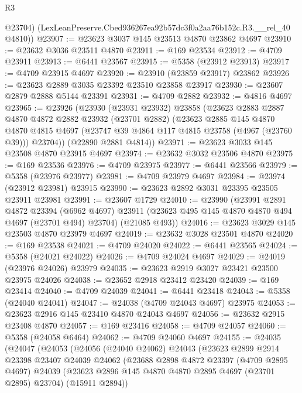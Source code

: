 \begin{lexlean}{R3}
\begin{coremodule}
        @23704)
      (LexLeanPreserve.Cbed936267ea92b57dc3f0a2aa76b152c.R3.__rel_40 @4810))
@23907 := @23623 @3037 @145 @23513 @4870 @23862 @4697
@23910 := @23632 @3036 @23511 @4870
@23911 := @169 @23534
@23912 := @4709 @23911
@23913 := @6441 @23567
@23915 := @5358 (@23912 @23913)
@23917 := @4709 @23915 @4697
@23920 := @23910 (@23859 @23917) @23862
@23926 := @23623 @2889 @3035 @23392 @23510 @23858 @23917
@23930 := @23607 @2879 @2888 @5144 @23391
@23931 := @4709 @2882
@23932 := @4816 @4697
@23965 := @23926
    (@23930
      (@23931 @23932)
      @23858
      (@23623
        @2883
        @2887
        @4870
        @4872
        @2882
        @23932
        (@23701 @2882)
        (@23623
          @2885
          @145
          @4870
          @4870
          @4815
          @4697
          (@23747 @39 @4864 @117 @4815 @23758 (@4967 (@23760 @39)))
          @23704))
      (@22890 @2881 @4814))
@23971 := @23623 @3033 @145 @23508 @4870 @23915 @4697
@23974 := @23632 @3032 @23506 @4870
@23975 := @169 @23536
@23976 := @4709 @23975
@23977 := @6441 @23566
@23979 := @5358 (@23976 @23977)
@23981 := @4709 @23979 @4697
@23984 := @23974 (@23912 @23981) @23915
@23990 := @23623 @2892 @3031 @23395 @23505 @23911 @23981
@23991 := @23607 @1729
@24010 := @23990
    (@23991
      @2891
      @4872
      @23394
      (@6962 @4697)
      @23911
      (@23623 @495 @145 @4870 @4870 @494 @4697 (@23701 @494) @23704)
      (@21085 @493))
@24016 := @23623 @3029 @145 @23503 @4870 @23979 @4697
@24019 := @23632 @3028 @23501 @4870
@24020 := @169 @23538
@24021 := @4709 @24020
@24022 := @6441 @23565
@24024 := @5358 (@24021 @24022)
@24026 := @4709 @24024 @4697
@24029 := @24019 (@23976 @24026) @23979
@24035 := @23623 @2919 @3027 @23421 @23500 @23975 @24026
@24038 := @23652 @2918 @23412 @23420
@24039 := @169 @23414
@24040 := @4709 @24039
@24041 := @6441 @23418
@24043 := @5358 (@24040 @24041)
@24047 := @24038 (@4709 @24043 @4697) @23975
@24053 := @23623 @2916 @145 @23410 @4870 @24043 @4697
@24056 := @23632 @2915 @23408 @4870
@24057 := @169 @23416
@24058 := @4709 @24057
@24060 := @5358 (@24058 @6464)
@24062 := @4709 @24060 @4697
@24155 := @24035
    (@24047
      (@24053
        (@24056
          (@24040 @24062)
          @24043
          (@23623
            @2899
            @2914
            @23398
            @23407
            @24039
            @24062
            (@23688
              @2898
              @4872
              @23397
              (@4709 @2895 @4697)
              @24039
              (@23623 @2896 @145 @4870 @4870 @2895 @4697 (@23701 @2895) @23704)
              (@15911 @2894))

\end{coremodule}
\end{lexlean}
